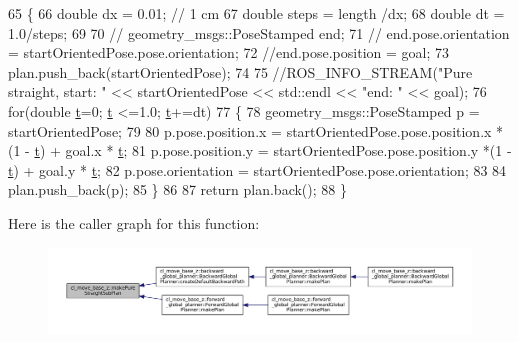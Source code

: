 \begin{DoxyCode}
65     \{
66         \textcolor{keywordtype}{double} dx = 0.01; \textcolor{comment}{// 1 cm}
67         \textcolor{keywordtype}{double} steps = length /dx;
68         \textcolor{keywordtype}{double} dt = 1.0/steps;
69 
70         \textcolor{comment}{// geometry\_msgs::PoseStamped end;}
71         \textcolor{comment}{// end.pose.orientation = startOrientedPose.pose.orientation;}
72         \textcolor{comment}{//end.pose.position = goal;}
73         plan.push\_back(startOrientedPose);
74 
75         \textcolor{comment}{//ROS\_INFO\_STREAM("Pure straight, start: " << startOrientedPose << std::endl << "end: " << goal);}
76         \textcolor{keywordflow}{for}(\textcolor{keywordtype}{double} \hyperlink{namespacebattery__monitor__node_a7a63d20d1ea461e280f4eb5b47f925cd}{t}=0; \hyperlink{namespacebattery__monitor__node_a7a63d20d1ea461e280f4eb5b47f925cd}{t} <=1.0; \hyperlink{namespacebattery__monitor__node_a7a63d20d1ea461e280f4eb5b47f925cd}{t}+=dt)
77         \{
78             geometry\_msgs::PoseStamped p = startOrientedPose;
79             
80             p.pose.position.x =  startOrientedPose.pose.position.x *(1 - \hyperlink{namespacebattery__monitor__node_a7a63d20d1ea461e280f4eb5b47f925cd}{t}) + goal.x * 
      \hyperlink{namespacebattery__monitor__node_a7a63d20d1ea461e280f4eb5b47f925cd}{t};
81             p.pose.position.y =  startOrientedPose.pose.position.y *(1 - \hyperlink{namespacebattery__monitor__node_a7a63d20d1ea461e280f4eb5b47f925cd}{t}) + goal.y * 
      \hyperlink{namespacebattery__monitor__node_a7a63d20d1ea461e280f4eb5b47f925cd}{t};
82             p.pose.orientation = startOrientedPose.pose.orientation;
83             
84             plan.push\_back(p);
85         \}
86     
87         \textcolor{keywordflow}{return} plan.back();
88     \}
\end{DoxyCode}
Here is the caller graph for this function\+:
\nopagebreak
\begin{figure}[H]
\begin{center}
\leavevmode
\includegraphics[width=350pt]{namespacecl__move__base__z_a84f0875e9e553c2795894cc9c21b2b3c_icgraph}
\end{center}
\end{figure}
